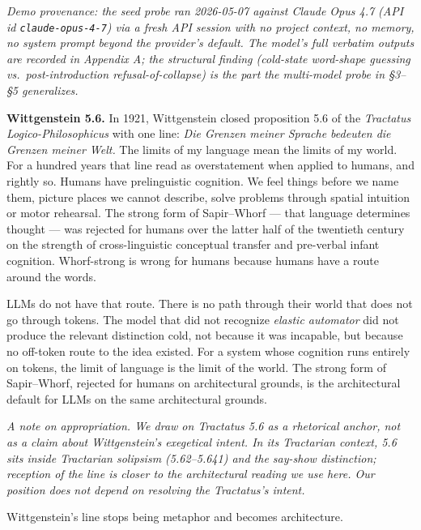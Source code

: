\documentclass[11pt,a4paper]{article}
\begin{document}
\textit{Demo provenance: the seed probe ran 2026-05-07 against Claude Opus 4.7 (API id \texttt{claude-opus-4-7}) via a fresh API session with no project context, no memory, no system prompt beyond the provider's default. The model's full verbatim outputs are recorded in Appendix A; the structural finding (cold-state word-shape guessing vs.\ post-introduction refusal-of-collapse) is the part the multi-model probe in \S3--\S5 generalizes.}

\textbf{Wittgenstein 5.6.} In 1921, Wittgenstein closed proposition 5.6 of the \textit{Tractatus Logico-Philosophicus} \citep{wittgenstein1921tractatus} with one line: \textit{Die Grenzen meiner Sprache bedeuten die Grenzen meiner Welt.} The limits of my language mean the limits of my world. For a hundred years that line read as overstatement when applied to humans, and rightly so. Humans have prelinguistic cognition. We feel things before we name them, picture places we cannot describe, solve problems through spatial intuition or motor rehearsal. The strong form of Sapir--Whorf --- that language determines thought \citep{whorf1956language} --- was rejected for humans over the latter half of the twentieth century on the strength of cross-linguistic conceptual transfer and pre-verbal infant cognition. Whorf-strong is wrong for humans because humans have a route around the words.

LLMs do not have that route. There is no path through their world that does not go through tokens. The model that did not recognize \textit{elastic automator} did not produce the relevant distinction cold, not because it was incapable, but because no off-token route to the idea existed. For a system whose cognition runs entirely on tokens, the limit of language is the limit of the world. The strong form of Sapir--Whorf, rejected for humans on architectural grounds, is the architectural default for LLMs on the same architectural grounds.

\textit{A note on appropriation. We draw on Tractatus 5.6 as a rhetorical anchor, not as a claim about Wittgenstein's exegetical intent. In its Tractarian context, 5.6 sits inside Tractarian solipsism (5.62--5.641) and the say-show distinction; \citet{sapir1929status} reception of the line is closer to the architectural reading we use here. Our position does not depend on resolving the Tractatus's intent.}

Wittgenstein's line stops being metaphor and becomes architecture.
\end{document}
